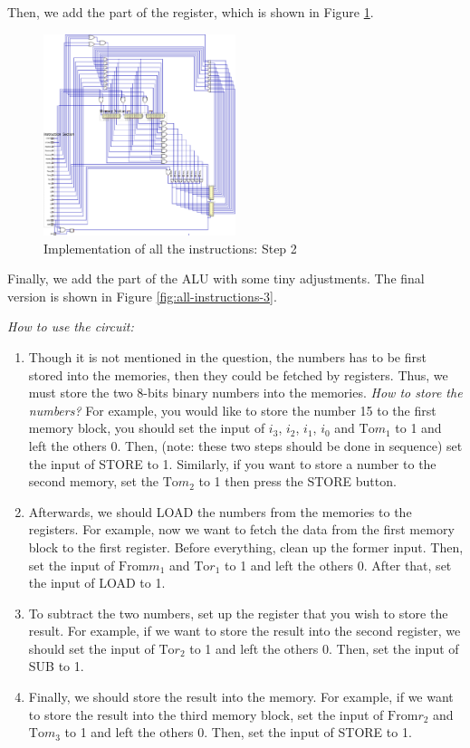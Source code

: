 \documentclass[conference]{IEEEtran}
\begin{document}
Then, we add the part of the register, which is shown in Figure \ref{fig:all-instructions-2}.

\begin{figure}[h!]
    \centering
    \includegraphics[width=0.5\textwidth]{assets/all-instructions-2.png}
    \caption{Implementation of all the instructions: Step 2}
    \label{fig:all-instructions-2}
\end{figure}

Finally, we add the part of the ALU with some tiny adjustments. The final version is shown in Figure \ref{fig:all-instructions-3}.


\textit{How to use the circuit:}

\begin{enumerate}
    \item Though it is not mentioned in the question, the numbers has to be first stored into the memories, then they could be fetched by registers. Thus, we must store the two 8-bits binary numbers into the memories.
    \textit{How to store the numbers?} For example, you would like to store the number 15 to the first memory block, you should set the input of $i_3$, $i_2$, $i_1$, $i_0$ and $\text{To}m_1$ to 1 and left the others 0. Then, (note: these two steps should be done in sequence) set the input of STORE to 1. Similarly, if you want to store a number to the second memory, set the $\text{To}m_2$ to 1 then press the STORE button.

    \item Afterwards, we should LOAD the numbers from the memories to the registers. For example, now we want to fetch the data from the first memory block to the first register. Before everything, clean up the former input. Then, set the input of $\text{From}m_1$ and $\text{To}r_1$ to 1 and left the others 0. After that, set the input of LOAD to 1.
    \item To subtract the two numbers, set up the register that you wish to store the result. For example, if we want to store the result into the second register, we should set the input of $\text{To}r_2$ to 1 and left the others 0. Then, set the input of SUB to 1.

    \item Finally, we should store the result into the memory. For example, if we want to store the result into the third memory block, set the input of $\text{From}r_2$ and $\text{To}m_3$ to 1 and left the others 0. Then, set the input of STORE to 1.

\end{enumerate}
\end{document}
